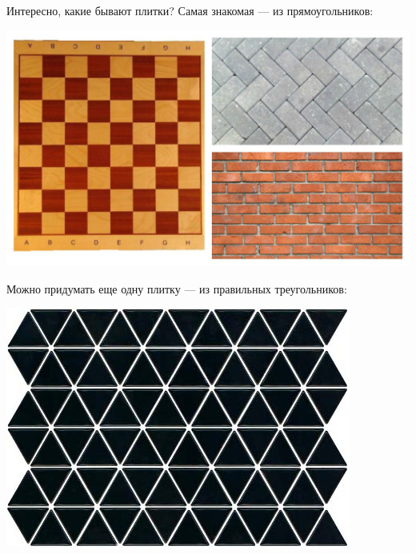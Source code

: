 \documentclass{beamer}
\begin{document}
\begin{frame}
Интересно, какие бывают плитки? Самая знакомая --- из прямоугольников:

\begin{center}
\includegraphics[width=\textwidth]{collage.jpg}
\end{center}

\end{frame}
\begin{frame}
Можно придумать еще одну плитку --- из правильных треугольников: 

\begin{center}
\includegraphics[width=.8\textwidth]{right_triangle.jpg}
\end{center}

\end{frame}
\end{document}
